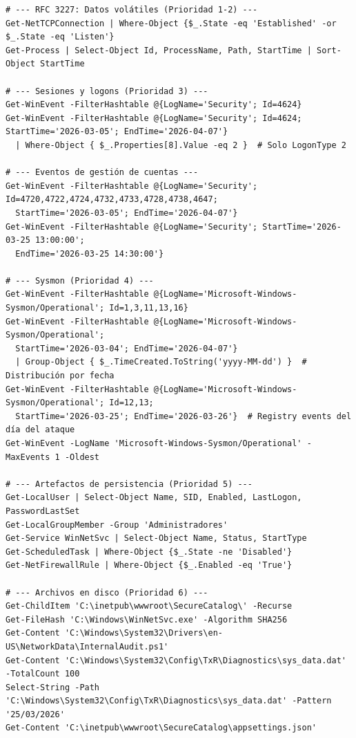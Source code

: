 \begin{lstlisting}
# --- RFC 3227: Datos volátiles (Prioridad 1-2) ---
Get-NetTCPConnection | Where-Object {$_.State -eq 'Established' -or $_.State -eq 'Listen'}
Get-Process | Select-Object Id, ProcessName, Path, StartTime | Sort-Object StartTime

# --- Sesiones y logons (Prioridad 3) ---
Get-WinEvent -FilterHashtable @{LogName='Security'; Id=4624}
Get-WinEvent -FilterHashtable @{LogName='Security'; Id=4624; StartTime='2026-03-05'; EndTime='2026-04-07'} 
  | Where-Object { $_.Properties[8].Value -eq 2 }  # Solo LogonType 2

# --- Eventos de gestión de cuentas ---
Get-WinEvent -FilterHashtable @{LogName='Security'; Id=4720,4722,4724,4732,4733,4728,4738,4647; 
  StartTime='2026-03-05'; EndTime='2026-04-07'}
Get-WinEvent -FilterHashtable @{LogName='Security'; StartTime='2026-03-25 13:00:00'; 
  EndTime='2026-03-25 14:30:00'}

# --- Sysmon (Prioridad 4) ---
Get-WinEvent -FilterHashtable @{LogName='Microsoft-Windows-Sysmon/Operational'; Id=1,3,11,13,16}
Get-WinEvent -FilterHashtable @{LogName='Microsoft-Windows-Sysmon/Operational'; 
  StartTime='2026-03-04'; EndTime='2026-04-07'} 
  | Group-Object { $_.TimeCreated.ToString('yyyy-MM-dd') }  # Distribución por fecha
Get-WinEvent -FilterHashtable @{LogName='Microsoft-Windows-Sysmon/Operational'; Id=12,13; 
  StartTime='2026-03-25'; EndTime='2026-03-26'}  # Registry events del día del ataque
Get-WinEvent -LogName 'Microsoft-Windows-Sysmon/Operational' -MaxEvents 1 -Oldest

# --- Artefactos de persistencia (Prioridad 5) ---
Get-LocalUser | Select-Object Name, SID, Enabled, LastLogon, PasswordLastSet
Get-LocalGroupMember -Group 'Administradores'
Get-Service WinNetSvc | Select-Object Name, Status, StartType
Get-ScheduledTask | Where-Object {$_.State -ne 'Disabled'}
Get-NetFirewallRule | Where-Object {$_.Enabled -eq 'True'}

# --- Archivos en disco (Prioridad 6) ---
Get-ChildItem 'C:\inetpub\wwwroot\SecureCatalog\' -Recurse
Get-FileHash 'C:\Windows\WinNetSvc.exe' -Algorithm SHA256
Get-Content 'C:\Windows\System32\Drivers\en-US\NetworkData\InternalAudit.ps1'
Get-Content 'C:\Windows\System32\Config\TxR\Diagnostics\sys_data.dat' -TotalCount 100
Select-String -Path 'C:\Windows\System32\Config\TxR\Diagnostics\sys_data.dat' -Pattern '25/03/2026'
Get-Content 'C:\inetpub\wwwroot\SecureCatalog\appsettings.json'
\end{lstlisting}
